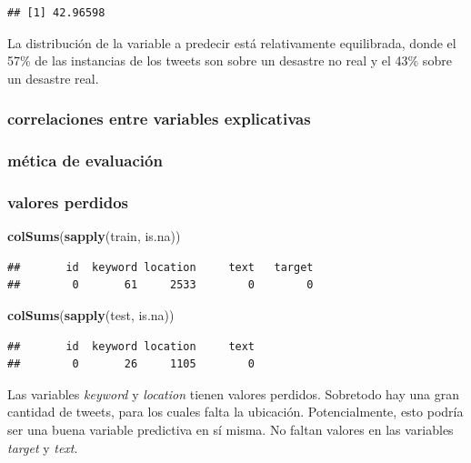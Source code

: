 \documentclass[
]{article}
\newenvironment{Shaded}{\begin{snugshade}}{\end{snugshade}}
\newcommand{\KeywordTok}[1]{\textcolor[rgb]{0.13,0.29,0.53}{\textbf{#1}}}
\newcommand{\NormalTok}[1]{#1}
\begin{document}
\begin{verbatim}
## [1] 42.96598
\end{verbatim}

La distribución de la variable a predecir está relativamente
equilibrada, donde el 57\% de las instancias de los tweets son sobre un
desastre no real y el 43\% sobre un desastre real.

\hypertarget{correlaciones-entre-variables-explicativas}{%
\subsubsection{correlaciones entre variables
explicativas}\label{correlaciones-entre-variables-explicativas}}

\hypertarget{muxe9tica-de-evaluaciuxf3n}{%
\subsubsection{mética de evaluación}\label{muxe9tica-de-evaluaciuxf3n}}

\hypertarget{valores-perdidos}{%
\subsubsection{valores perdidos}\label{valores-perdidos}}

\begin{Shaded}
\begin{Highlighting}[]
\KeywordTok{colSums}\NormalTok{(}\KeywordTok{sapply}\NormalTok{(train, is.na))}
\end{Highlighting}
\end{Shaded}

\begin{verbatim}
##       id  keyword location     text   target 
##        0       61     2533        0        0
\end{verbatim}

\begin{Shaded}
\begin{Highlighting}[]
\KeywordTok{colSums}\NormalTok{(}\KeywordTok{sapply}\NormalTok{(test, is.na))}
\end{Highlighting}
\end{Shaded}

\begin{verbatim}
##       id  keyword location     text 
##        0       26     1105        0
\end{verbatim}

Las variables \emph{keyword} y \emph{location} tienen valores perdidos.
Sobretodo hay una gran cantidad de tweets, para los cuales falta la
ubicación. Potencialmente, esto podría ser una buena variable predictiva
en sí misma. No faltan valores en las variables \emph{target} y
\emph{text}.
\end{document}
